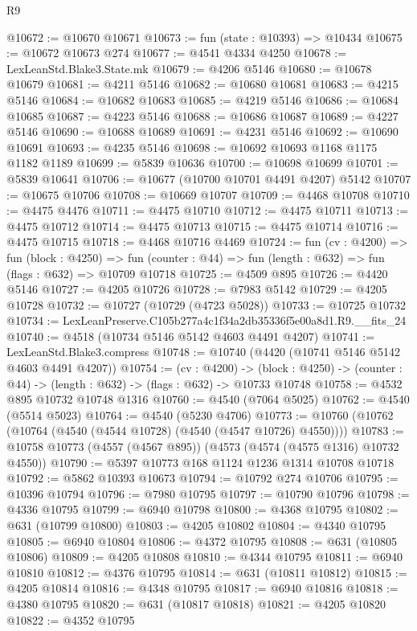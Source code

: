 \begin{lexlean}{R9}
\begin{coremodule}
@10672 := @10670 @10671
@10673 := fun (state : @10393) => @10434
@10675 := @10672 @10673 @274
@10677 := @4541 @4334 @4250
@10678 := LexLeanStd.Blake3.State.mk
@10679 := @4206 @5146
@10680 := @10678 @10679
@10681 := @4211 @5146
@10682 := @10680 @10681
@10683 := @4215 @5146
@10684 := @10682 @10683
@10685 := @4219 @5146
@10686 := @10684 @10685
@10687 := @4223 @5146
@10688 := @10686 @10687
@10689 := @4227 @5146
@10690 := @10688 @10689
@10691 := @4231 @5146
@10692 := @10690 @10691
@10693 := @4235 @5146
@10698 := @10692 @10693 @1168 @1175 @1182 @1189
@10699 := @5839 @10636
@10700 := @10698 @10699
@10701 := @5839 @10641
@10706 := @10677 (@10700 @10701 @4491 @4207) @5142
@10707 := @10675 @10706
@10708 := @10669 @10707
@10709 := @4468 @10708
@10710 := @4475 @4476
@10711 := @4475 @10710
@10712 := @4475 @10711
@10713 := @4475 @10712
@10714 := @4475 @10713
@10715 := @4475 @10714
@10716 := @4475 @10715
@10718 := @4468 @10716 @4469
@10724 := fun (cv : @4200) =>
  fun (block : @4250) =>
  fun (counter : @44) => fun (length : @632) => fun (flags : @632) => @10709 @10718
@10725 := @4509 @895
@10726 := @4420 @5146
@10727 := @4205 @10726
@10728 := @7983 @5142
@10729 := @4205 @10728
@10732 := @10727 (@10729 (@4723 @5028))
@10733 := @10725 @10732
@10734 := LexLeanPreserve.C105b277a4c1f34a2db35336f5e00a8d1.R9.__fits_24
@10740 := @4518 (@10734 @5146 @5142 @4603 @4491 @4207)
@10741 := LexLeanStd.Blake3.compress
@10748 := @10740 (@4420 (@10741 @5146 @5142 @4603 @4491 @4207))
@10754 := (cv : @4200) ->
  (block : @4250) -> (counter : @44) -> (length : @632) -> (flags : @632) -> @10733 @10748
@10758 := @4532 @895 @10732 @10748 @1316
@10760 := @4540 (@7064 @5025)
@10762 := @4540 (@5514 @5023)
@10764 := @4540 (@5230 @4706)
@10773 := @10760 (@10762 (@10764 (@4540 (@4544 @10728) (@4540 (@4547 @10726) @4550))))
@10783 := @10758 @10773 (@4557 (@4567 @895)) (@4573 (@4574 (@4575 @1316) @10732 @4550))
@10790 := @5397 @10773 @168 @1124 @1236 @1314 @10708 @10718
@10792 := @5862 @10393 @10673
@10794 := @10792 @274 @10706
@10795 := @10396 @10794
@10796 := @7980 @10795
@10797 := @10790 @10796
@10798 := @4336 @10795
@10799 := @6940 @10798
@10800 := @4368 @10795
@10802 := @631 (@10799 @10800)
@10803 := @4205 @10802
@10804 := @4340 @10795
@10805 := @6940 @10804
@10806 := @4372 @10795
@10808 := @631 (@10805 @10806)
@10809 := @4205 @10808
@10810 := @4344 @10795
@10811 := @6940 @10810
@10812 := @4376 @10795
@10814 := @631 (@10811 @10812)
@10815 := @4205 @10814
@10816 := @4348 @10795
@10817 := @6940 @10816
@10818 := @4380 @10795
@10820 := @631 (@10817 @10818)
@10821 := @4205 @10820
@10822 := @4352 @10795

\end{coremodule}
\end{lexlean}
